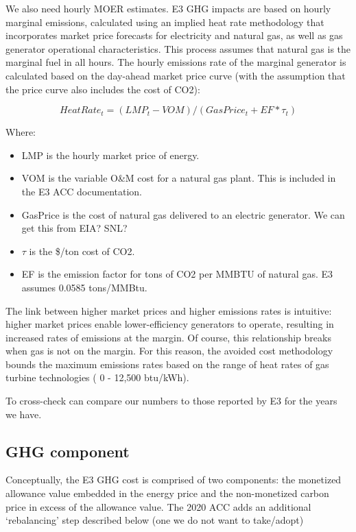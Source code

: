 \documentclass[11pt]{article}
\begin{document}
\bigskip

We also need hourly MOER estimates. E3 GHG impacts are based on hourly marginal emissions, calculated using an implied heat rate methodology that incorporates market price forecasts for electricity and natural gas, as well as gas generator operational characteristics. This process assumes that natural gas is the marginal fuel in all hours. The hourly emissions rate of the marginal generator is calculated based on the day-ahead market price curve (with the assumption that the price curve also includes the cost of CO2):
\begin{center}
\begin{equation*}
HeatRate_{t} = (LMP_t  - VOM) / (GasPrice_t + EF * \tau_t)
\end{equation*}
\end{center}
Where:

\begin{itemize}
\item LMP is the hourly market price of energy. 
\item VOM is the variable O&M cost for a natural gas plant.  This is included in the E3 ACC documentation.
\item GasPrice is the cost of natural gas delivered to an electric generator. We can get this from EIA? SNL?
\item $\tau$ is the \$/ton cost of CO2. 
\item EF is the emission factor for tons of CO2 per MMBTU of natural gas. E3 assumes 0.0585 tons/MMBtu. 
\end{itemize}

The link between higher market prices and higher emissions rates is intuitive: higher market prices enable lower-efficiency generators to operate, resulting in increased rates of emissions at the margin. Of course, this relationship breaks when gas is not on the margin. For this reason, the avoided cost methodology bounds the maximum emissions rates based on the range of heat rates of gas turbine technologies ( 0 - 12,500 btu/kWh).

\bigskip

To cross-check can compare our numbers to those reported by E3 for the years we have.


\subsection{GHG component}

Conceptually, the E3 GHG cost is comprised of two components: the monetized allowance value embedded in the energy price and the non-monetized carbon price in excess of the allowance value. The 2020 ACC adds an additional `rebalancing' step described below (one we do not want to take/adopt)
\end{document}
